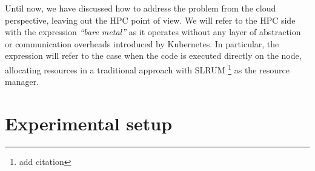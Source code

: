 Until now, we have discussed how to address the problem from the cloud
perspective, leaving out the HPC point of view. We will refer to the HPC side
with the expression \textit{``bare metal''} as it operates without any layer of
abstraction or communication overheads introduced by Kubernetes. In particular,
the expression will refer to the case when the code is executed directly on the
node, allocating resources in a traditional approach with SLRUM \footnote{add
citation} as the resource manager.


\section{Experimental setup}
\label{sec:measurements}



